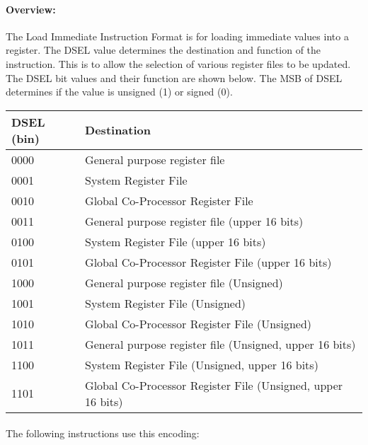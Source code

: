 \documentclass[letterpaper, 11pt]{article}
\begin{document}
\paragraph{Overview:}The Load Immediate Instruction Format is for loading immediate values into a register.
The DSEL value determines the destination and function of the instruction. This is to allow the selection
of various register files to be updated. The DSEL bit values and their function are shown below. 
The MSB of DSEL determines if the value is unsigned (1) or signed (0). \\
\begin{tabular}{l|l}
		DSEL (bin) & Destination \\ \hline
		0000 & General purpose register file \\
		0001 & System Register File \\
		0010 & Global Co-Processor Register File \\ 
		0011 & General purpose register file (upper 16 bits) \\
		0100 & System Register File (upper 16 bits)\\
		0101 & Global Co-Processor Register File (upper 16 bits)\\ 
		1000 & General purpose register file  (Unsigned)\\
		1001 & System Register File (Unsigned)\\
		1010 & Global Co-Processor Register File (Unsigned)\\ 
		1011 & General purpose register file  (Unsigned, upper 16 bits)\\
		1100 & System Register File (Unsigned, upper 16 bits)\\
		1101 & Global Co-Processor Register File (Unsigned, upper 16 bits)\\ 
		
		\end{tabular}

\paragraph{}The following instructions use this encoding: \\
\end{document}
